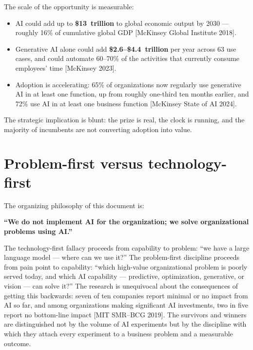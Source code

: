 The scale of the opportunity is measurable:
\begin{itemize}
  \item AI could add up to \textbf{\$13~trillion} to global economic output by
        2030 — roughly 16\% of cumulative global GDP [McKinsey Global
        Institute 2018].
  \item Generative AI alone could add \textbf{\$2.6--\$4.4~trillion} per year
        across 63 use cases, and could automate 60--70\% of the activities that
        currently consume employees' time [McKinsey 2023].
  \item Adoption is accelerating: 65\% of organizations now regularly use
        generative AI in at least one function, up from roughly one-third ten
        months earlier, and 72\% use AI in at least one business function
        [McKinsey State of AI 2024].
\end{itemize}

The strategic implication is blunt: the prize is real, the clock is running,
and the majority of incumbents are not converting adoption into value.

\section{Problem-first versus technology-first}

The organizing philosophy of this document is:

\begin{center}
  \textbf{\large ``We do not implement AI for the organization; we solve
  organizational problems using AI.''}
\end{center}

The technology-first fallacy proceeds from capability to problem: ``we have
a large language model — where can we use it?'' The problem-first discipline
proceeds from pain point to capability: ``which high-value organizational
problem is poorly served today, and which AI capability — predictive,
optimization, generative, or vision — can solve it?'' The research is
unequivocal about the consequences of getting this backwards: seven of ten
companies report minimal or no impact from AI so far, and among organizations
making significant AI investments, two in five report no bottom-line impact
[MIT SMR--BCG 2019]. The survivors and winners are distinguished not by the
volume of AI experiments but by the discipline with which they attach every
experiment to a business problem and a measurable outcome.
